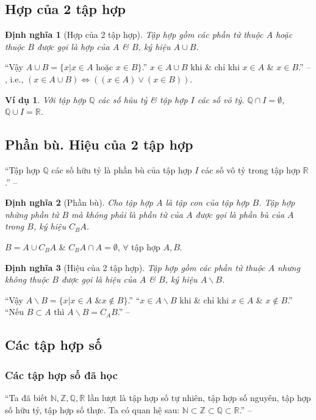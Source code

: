 \documentclass[oneside]{book}
\numberwithin{equation}{section}
\newtheorem{dinhnghia}{Định nghĩa}[section]
\newtheorem{vidu}{Ví dụ}[section]
\begin{document}
\subsection{Hợp của 2 tập hợp}

\begin{dinhnghia}[Hợp của 2 tập hợp]
	Tập hợp gồm các phần tử thuộc $A$ hoặc thuộc $B$ được gọi là \emph{hợp} của $A$ \& $B$, ký hiệu $A\cup B$.
\end{dinhnghia}
``Vậy $A\cup B = \{x|x\in A\mbox{ hoặc } x\in B\}$.'' $x\in A\cup B$ khi \& chỉ khi $x\in A$ \& $x\in B$.'' -- \cite[p. 15]{SGK_Toan_10_Canh_Dieu_tap_1}, i.e., $(x\in A\cup B)\Leftrightarrow((x\in A)\lor(x\in B))$.

\begin{vidu}
	Với tập hợp $\mathbb{Q}$ các số hũu tỷ \& tập hợp $I$ các số vô tỷ. $\mathbb{Q}\cap I = \emptyset$, $\mathbb{Q}\cup I = \mathbb{R}$.
\end{vidu}

\subsection{Phần bù. Hiệu của 2 tập hợp}
``Tập hợp $\mathbb{Q}$ các số hữu tỷ là phần bù của tập hợp $I$ các số vô tỷ trong tập hợp  $\mathbb{R}$.'' -- \cite[p. 15]{SGK_Toan_10_Canh_Dieu_tap_1}

\begin{dinhnghia}[Phần bù]
	Cho tập hợp $A$ là tập con của tập hợp $B$. Tập hợp những phần tử $B$ mà không phải là phần tử của $A$ được gọi là \emph{phần bù} của $A$ trong $B$, ký hiệu $C_BA$.
\end{dinhnghia}
$B = A\cup C_BA$ \& $C_BA\cap A = \emptyset$, $\forall$ tập hợp $A,B$.

\begin{dinhnghia}[Hiệu của 2 tập hợp]
	Tập hợp gồm các phần tử thuộc $A$ nhưng không thuộc $B$ được gọi là \emph{hiệu} của $A$ \& $B$, ký hiệu $A\backslash B$.
\end{dinhnghia}
``Vậy $A\backslash B = \{x|x\in A\mbox{ \& } x\notin B\}$.'' ``$x\in A\backslash B$ khi \& chỉ khi $x\in A$ \& $x\notin B$.'' ``Nếu $B\subset A$ thì $A\backslash B = C_AB$.'' -- \cite[p. 16]{SGK_Toan_10_Canh_Dieu_tap_1}

\subsection{Các tập hợp số}

\subsubsection{Các tập hợp số đã học}
``Ta đã biết $\mathbb{N},\mathbb{Z},\mathbb{Q},\mathbb{R}$ lần lượt là tập hợp số tự nhiên, tập hợp số nguyên, tập hợp số hữu tỷ, tập hợp số thực. Ta có quan hệ sau: $\mathbb{N}\subset\mathbb{Z}\subset\mathbb{Q}\subset\mathbb{R}$.'' -- \cite[p. 17]{SGK_Toan_10_Canh_Dieu_tap_1}
\end{document}

